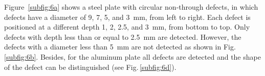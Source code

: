 \documentclass[12pt]{spieman}
\begin{document}
\begin{spacing}{2}

Figure~\ref{subfig:6a} shows a steel plate with circular non-through defects, in which defects have a diameter of 9, 7, 5, and \SI{3}{\milli \metre}, from left to right. 
Each defect is positioned at a different depth 1, 2, 2.5, and \SI{3}{\milli \metre}, from bottom to top. 
Only defects with depth less than or equal to \SI{2.5}{\milli \metre} are detected. 
However, the defects with a diameter less than \SI{5}{\milli \metre} are not detected as shown in Fig.\,\ref{subfig:6b}.
Besides, for the aluminum plate all defects are detected and the shape of the defect can be distinguished (see Fig.\,\ref{subfig:6d}). 

 


\end{spacing}
\end{document}
